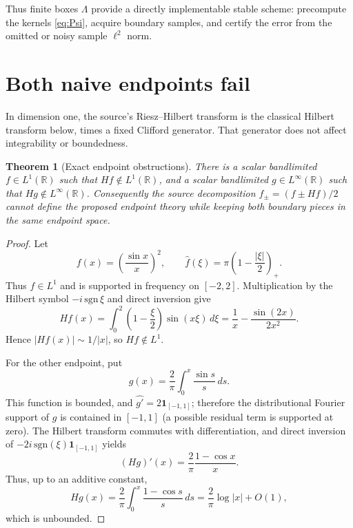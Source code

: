 \documentclass[10pt]{article}
\newtheorem{theorem}{Theorem}
\newcommand{\R}{\mathbb R}
\begin{document}
Thus finite boxes $\Lambda$ provide a directly implementable stable scheme:
precompute the kernels \eqref{eq:Psi}, acquire boundary samples, and certify
the error from the omitted or noisy sample $\ell^2$ norm.

\section{Both naive endpoints fail}

In dimension one, the source's Riesz--Hilbert transform is the classical
Hilbert transform below, times a fixed Clifford generator.  That generator
does not affect integrability or boundedness.

\begin{theorem}[Exact endpoint obstructions]\label{thm:endpoints}
There is a scalar bandlimited $f\in L^1(\R)$ such that $Hf\notin L^1(\R)$,
and a scalar bandlimited $g\in L^\infty(\R)$ such that
$Hg\notin L^\infty(\R)$.  Consequently the source decomposition
$f_\pm=(f\pm Hf)/2$ cannot define the proposed endpoint theory while keeping
both boundary pieces in the same endpoint space.
\end{theorem}

\begin{proof}
Let
\[
 f(x)=\left(\frac{\sin x}{x}\right)^2,
 \qquad
 \widehat f(\xi)=\pi\left(1-\frac{|\xi|}{2}\right)_+.
\]
Thus $f\in L^1$ and is supported in frequency on $[-2,2]$.  Multiplication by
the Hilbert symbol $-i\,\mathrm{sgn}\,\xi$ and direct inversion give
\begin{equation}\label{eq:Hf}
 Hf(x)=\int_0^2\left(1-\frac\xi2\right)\sin(x\xi)\,d\xi
 =\frac1x-\frac{\sin(2x)}{2x^2}.
\end{equation}
Hence $|Hf(x)|\sim1/|x|$, so $Hf\notin L^1$.

For the other endpoint, put
\[
 g(x)=\frac2\pi\int_0^x\frac{\sin s}{s}\,ds.
\]
This function is bounded, and
$\widehat{g'}=2\mathbf1_{[-1,1]}$; therefore the distributional Fourier
support of $g$ is contained in $[-1,1]$ (a possible residual term is supported
at zero).  The Hilbert transform commutes with differentiation, and direct
inversion of $-2i\,\mathrm{sgn}(\xi)\mathbf1_{[-1,1]}$ yields
\[
 (Hg)'(x)=\frac2\pi\frac{1-\cos x}{x}.
\]
Thus, up to an additive constant,
\begin{equation}\label{eq:Hg}
 Hg(x)=\frac2\pi\int_0^x\frac{1-\cos s}{s}\,ds
 =\frac2\pi\log|x|+O(1),
\end{equation}
which is unbounded.
\end{proof}
\end{document}
